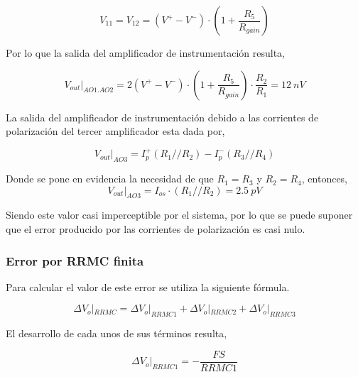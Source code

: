 \documentclass[12pt,A4paper,titlepage]{article}
\begin{document}
\begin{equation}
    V_{11} = V_{12} = (V^+ - V^-) \cdot \left(1 + \frac{R_5}{R_{gain}}\right)
\end{equation}

\bigskip
\hspace{1mm} Por lo que la salida del amplificador de instrumentación resulta,

\begin{equation}
    V_{out}|_{AO1.AO2} = 2(V^+ - V^-) \cdot \left(1+\frac{R_5}{R_{gain}}\right) \cdot \frac{R_2}{R_1} = 12~nV
\end{equation}

\bigskip
\hspace{1mm} La salida del amplificador de instrumentación debido a las corrientes de polarización del tercer amplificador esta dada por,

\begin{equation}
    V_{out}|_{AO3} = I_p^+ (R_1 // R_2) - I_p^- (R_3 // R_4)
\end{equation}

\bigskip
\hspace{1mm} Donde se pone en evidencia la necesidad de que \(R_1 = R_3\) y \(R_2 = R_4\), entonces,
\begin{equation}
    V_{out}|_{AO3} = I_{os} \cdot (R_1 // R_2) = 2.5~pV
\end{equation}

\bigskip
\hspace{1mm} Siendo este valor casi imperceptible por el sistema, por lo que se puede suponer que el error producido por las corrientes de polarización es casi nulo.

\subsubsection{\textbf{Error por RRMC finita}}

\hspace{1mm} Para calcular el valor de este error se utiliza la siguiente fórmula.

\begin{equation}
    \Delta V_o|_{RRMC} = \Delta V_o|_{RRMC1} +\Delta V_o|_{RRMC2} +\Delta V_o|_{RRMC3}
\end{equation}

\bigskip
\hspace{1mm} El desarrollo de cada unos de sus términos resulta,

\begin{equation}
    \Delta V_o|_{RRMC1} = - \frac{FS}{RRMC1}
\end{equation}
\end{document}

